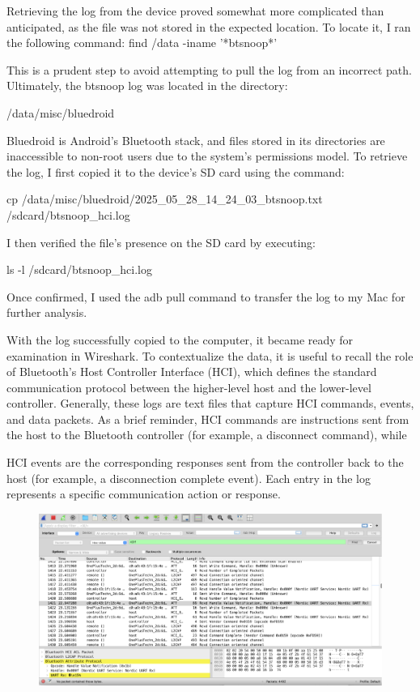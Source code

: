 Retrieving the log from the device proved somewhat more complicated than anticipated, as the file was not stored in the expected location. To locate it, I ran the following command:
find /data -iname '*btsnoop*'

This is a prudent step to avoid attempting to pull the log from an incorrect path. Ultimately, the btsnoop log was located in the directory:

/data/misc/bluedroid

Bluedroid is Android’s Bluetooth stack, and files stored in its directories are inaccessible to non-root users due to the system’s permissions model. To retrieve the log, I first copied it to the device’s SD card using the command:

cp /data/misc/bluedroid/2025\_05\_28\_14\_24\_03\_btsnoop.txt  /sdcard/btsnoop\_hci.log

I then verified the file’s presence on the SD card by executing:

ls -l /sdcard/btsnoop\_hci.log

Once confirmed, I used the adb pull command to transfer the log to my Mac for further analysis.

With the log successfully copied to the computer, it became ready for examination in Wireshark. To contextualize the data, it is useful to recall the role of Bluetooth’s Host Controller Interface (HCI), which defines the standard communication protocol between the higher-level host and the lower-level controller. Generally, these logs are text files that capture HCI commands, events, and data packets. As a brief reminder, HCI commands are instructions sent from the host to the Bluetooth controller (for example, a disconnect command), while 

HCI events are the corresponding responses sent from the controller back to the host (for example, a disconnection complete event). Each entry in the log represents a specific communication action or response.

\begin{figure}
	\centering
	\includegraphics[width=0.7\linewidth]{hci_snoop_log}
	\caption{}
	\label{fig:hcisnooplog}
\end{figure}

